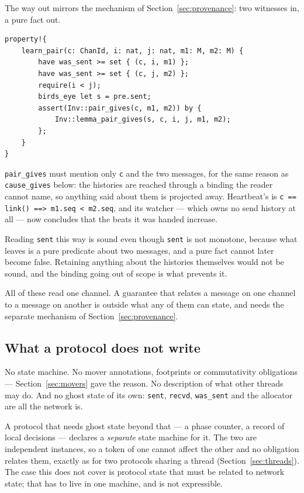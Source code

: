 \documentclass[11pt]{article}
\newcommand{\code}[1]{\texttt{#1}}
\newcommand{\srcname}[1]{%
  \vspace{0.9em}\noindent{\sffamily\scriptsize\color{comment}\MakeUppercase{#1}}\par
  \vspace{-0.7em}}
\begin{document}
The way out mirrors the mechanism of Section~\ref{sec:provenance}: two witnesses
in, a pure fact out.

\srcname{src/tok.rs --- reading a pairwise guarantee}
\begin{lstlisting}
property!{
    learn_pair(c: ChanId, i: nat, j: nat, m1: M, m2: M) {
        have was_sent >= set { (c, i, m1) };
        have was_sent >= set { (c, j, m2) };
        require(i < j);
        birds_eye let s = pre.sent;
        assert(Inv::pair_gives(c, m1, m2)) by {
            Inv::lemma_pair_gives(s, c, i, j, m1, m2);
        };
    }
}
\end{lstlisting}

\code{pair\_gives} must mention only \code{c} and the two messages, for the
same reason as \code{cause\_gives} below: the histories are reached through a
binding the reader cannot name, so anything said about them is projected away.
Heartbeat's is \code{c == link() ==> m1.seq < m2.seq}, and its watcher --- which
owns no send history at all --- now concludes that the beats it was handed
increase.

Reading \code{sent} this way is sound even though \code{sent} is not monotone,
because what leaves is a pure predicate about two messages, and a pure fact
cannot later become false. Retaining anything about the histories themselves
would not be sound, and the binding going out of scope is what prevents it.

All of these read one channel. A guarantee that relates a message on one channel
to a message on another is outside what any of them can state, and needs the
separate mechanism of Section~\ref{sec:provenance}.

\subsection*{What a protocol does not write}

No state machine. No mover annotations, footprints or commutativity obligations
--- Section~\ref{sec:movers} gave the reason. No description of what other
threads may do. And no ghost state of its own: \code{sent}, \code{recvd},
\code{was\_sent} and the allocator are all the network is.

A protocol that needs ghost state beyond that --- a phase counter, a record of
local decisions --- declares a \emph{separate} state machine for it. The two are
independent instances, so a token of one cannot affect the other and no
obligation relates them, exactly as for two protocols sharing a thread
(Section~\ref{sec:threads}). The case this does not cover is protocol state that
must be related to network state; that has to live in one machine, and is not
expressible.
\end{document}
